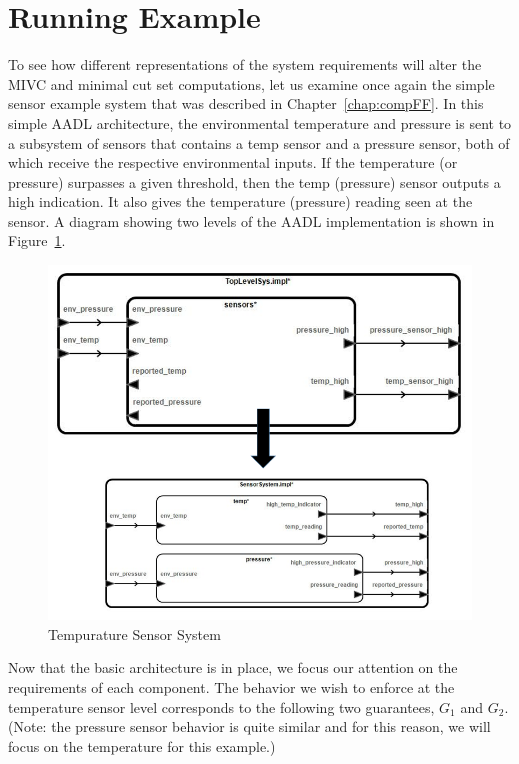 \section{Running Example}
\label{sec:granularityEx}
To see how different representations of the system requirements will alter the MIVC and minimal cut set computations, let us examine once again the simple sensor example system that was described in Chapter~\ref{chap:compFF}. In this simple AADL architecture, the environmental temperature and pressure is sent to a subsystem of sensors that contains a temp sensor and a pressure sensor, both of which receive the respective environmental inputs. If the temperature (or pressure) surpasses a given threshold, then the temp (pressure) sensor outputs a high indication. It also gives the temperature (pressure) reading seen at the sensor. A diagram showing two levels of the AADL implementation is shown in Figure~\ref{fig:sensorGran1}.  

\begin{figure}[h]
\begin{center}
\includegraphics[width=14cm]{images/sensorGran.png}
\caption{Tempurature Sensor System} 
\label{fig:sensorGran1}
\end{center}
\end{figure}

Now that the basic architecture is in place, we focus our attention on the requirements of each component. The behavior we wish to enforce at the temperature sensor level corresponds to the following two guarantees, $G_1$ and $G_2$. (Note: the pressure sensor behavior is quite similar and for this reason, we will focus on the temperature for this example.) 

